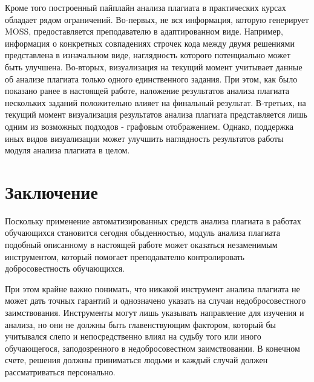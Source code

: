 \documentclass[a4paper,14pt]{extarticle}
\begin{document}
Кроме того построенный пайплайн анализа плагиата в практических курсах обладает рядом ограничений. Во-первых, не вся информация, которую генерирует MOSS, предоставляется преподавателю в адаптированном виде. Например, информация о конкретных совпадениях строчек кода между двумя решениями представлена в изначальном виде, наглядность которого потенциально может быть улучшена. Во-вторых, визуализация на текущий момент учитывает данные об анализе плагиата только одного единственного задания. При этом, как было показано ранее в настоящей работе, наложение результатов анализа плагиата нескольких заданий положительно влияет на финальный результат. В-третьих, на текущий момент визуализация результатов анализа плагиата представляется лишь одним из возможных подходов - графовым отображением. Однако, поддержка иных видов визуализации может улучшить наглядность результатов работы модуля анализа плагиата в целом.

\section{Заключение}

Поскольку применение автоматизированных средств анализа плагиата в работах обучающихся становится сегодня обыденностью, модуль анализа плагиата подобный описанному в настоящей работе может оказаться незаменимым инструментом, который помогает преподавателю контролировать добросовестность обучающихся.

При этом крайне важно понимать, что никакой инструмент анализа плагиата не может дать точных гарантий и однозначено указать на случаи недобросовестного заимствования. Инструменты могут лишь указывать направление для изучения и анализа, но они не должны быть главенствующим фактором, который бы учитывался слепо и непосредственно влиял на судьбу того или иного обучающегося, заподозренного в недобросовестном заимствовании. В конечном счете, решения должны приниматься людьми и каждый случай должен рассматриваться персонально.



\end{document}

